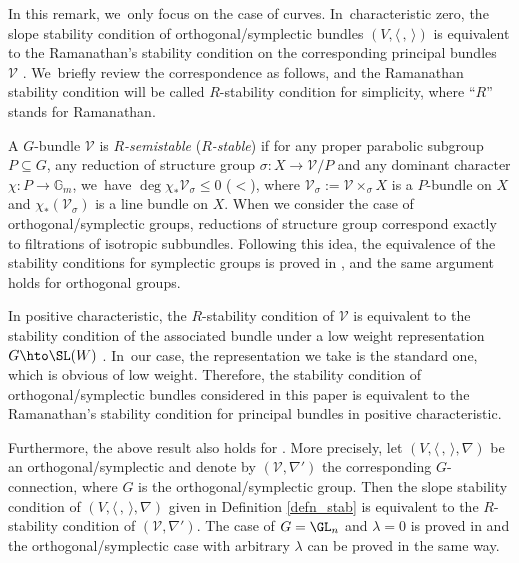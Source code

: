 \begin{rem}
In this remark, we~only focus on the case of curves. In~characteristic zero, the slope stability condition of orthogonal/symplectic bundles $(V, \langle \,, \, \rangle)$ is equivalent to the Ramanathan's stability condition on the corresponding principal bundles~$\mathcal{V}$ \cite{Ra75,Ra96a,Ra96b}. We~briefly review the correspondence as follows, and the Ramanathan stability condition will be called $R$-stability condition for simplicity, where ``$R$'' stands for Ramanathan.

A $G$-bundle $\mathcal{V}$ is \emph{$R$-semistable} (\resp \emph{$R$-stable}) if for any proper parabolic subgroup $P \subseteq G$, any reduction of structure group $\sigma: X \to \mathcal{V}/P$ and any dominant character $\chi: P \to \mathbb{G}_m$, we~have $\deg \chi_* \mathcal{V}_\sigma \leq 0$ (\resp $<$), where $\mathcal{V}_\sigma := \mathcal{V} \times_{\sigma} X$ is a $P$-bundle on $X$ and $\chi_* (\mathcal{V}_\sigma)$ is a line bundle on $X$. When we consider the case of orthogonal/symplectic groups, reductions of structure group correspond exactly to filtrations of isotropic subbundles. Following this idea, the equivalence of the stability conditions for symplectic groups is proved in \cite[App.]{KSZ21}, and the same argument holds for orthogonal groups.

In positive characteristic, the $R$-stability condition of $\mathcal{V}$ is equivalent to the stability condition of the associated bundle under a low weight representation $G \hto \SL(W)$ \cite[\S 2]{BP03}. In~our case, the representation we take is the standard one, which is obvious of low weight. Therefore, the stability condition of orthogonal/symplectic bundles considered in this paper is equivalent to the Ramanathan's stability condition for principal bundles in positive characteristic.

Furthermore, the above result also holds for \lconnections. More precisely, let $(V, \langle \,, \, \rangle, \nabla)$ be an orthogonal/symplectic \lconnection and denote by $(\mathcal{V},\nabla')$ the corresponding $G$-connection, where $G$ is the orthogonal/symplectic group. Then the slope stability condition of $(V, \langle \,, \, \rangle, \nabla)$ given in Definition \ref{defn_stab} is equivalent to the $R$-stability condition of $(\mathcal{V},\nabla')$. The case of $G=\GL_n$ and $\lambda = 0$ is proved in \cite[Prop.\,5.5]{KSZ23} and the orthogonal/symplectic case with arbitrary $\lambda$ can be proved in the same way.
\end{rem}

